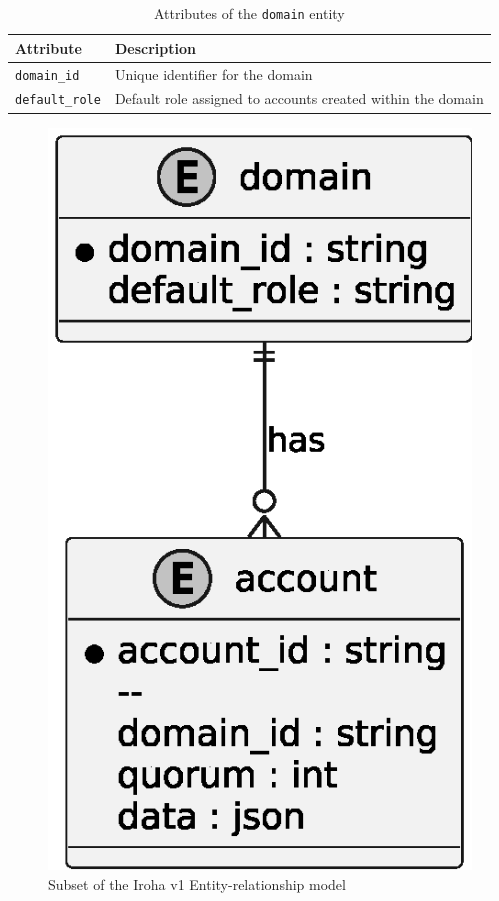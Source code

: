 \documentclass[final]{rc-book-2.14}
\begin{document}
\begin{table}[h]
    \centering
    \renewcommand{\arraystretch}{1.2}
    \caption{Attributes of the \texttt{domain} entity}
    \label{tab:domain_entity}
    \begin{tabularx}{\textwidth}{|l|X|}
        \hline
        \textbf{Attribute}     & \textbf{Description}                                        \\ \hline
        \texttt{domain\_id}    & Unique identifier for the domain                            \\ \hline
        \texttt{default\_role} & Default role assigned to accounts created within the domain \\ \hline
    \end{tabularx}
\end{table}



\begin{figure}[htbp]
    \centering
    \includegraphics[scale=0.5]{fig/iroha_v1_er_model.eps}
    \caption{Subset of the Iroha v1 Entity-relationship model}
    \label{fig:iroha_v1_er_model}
\end{figure}
\end{document}
